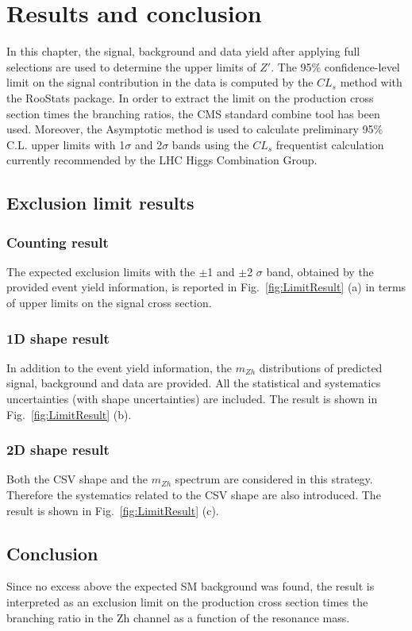 \chapter{Results and conclusion}

In this chapter, the signal, background and data yield after applying full selections are used to determine the upper limits of $Z'$. The 95\% confidence-level limit on the signal contribution in the data is computed by the $CL_{s}$ method\cite{CLs1,CLs2} with the RooStats\cite{RooStats} package. In order to extract the limit on the production cross section times the branching ratios, the CMS standard combine tool\cite{HiggsCombineTool} has been used. Moreover, the Asymptotic method is used to calculate preliminary 95\% C.L. upper limits with 1$\sigma$ and 2$\sigma$ bands using the $CL_{s}$ frequentist calculation currently recommended by the LHC Higgs Combination Group.

\section{Exclusion limit results}

\subsection{Counting result}
The expected exclusion limits with the $\pm$1 and $\pm$2 $\sigma$ band, obtained by the provided event yield information, is reported in Fig.~\ref{fig:LimitResult} (a) in terms of upper limits on the signal cross section.

\subsection{1D shape result}
In addition to the event yield information, the $m_{Zh}$ distributions of predicted signal, background and data are provided. All the statistical and systematics uncertainties (with shape uncertainties) are included. The result is shown in Fig.~\ref{fig:LimitResult} (b).

\subsection{2D shape result}
Both the CSV shape and the $m_{Zh}$ spectrum are considered in this strategy. Therefore the systematics related to the CSV shape are also introduced. The result is shown in Fig.~\ref{fig:LimitResult} (c).

\section{Conclusion}
Since no excess above the expected SM background was found, the result is interpreted as an exclusion limit on the production cross section times the branching ratio in the Zh channel as a function of the resonance mass.

